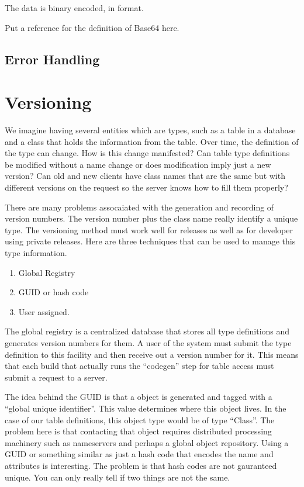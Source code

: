 The data is binary encoded, in  format.
\begin{fixme}
Put a reference for the definition of Base64 here.
\end{fixme}

\subsection{Error Handling}


\section{Versioning}

We imagine having several entities which are types, such as a table in
a database and a class that holds the information from the table. Over
time, the definition of the type can change. How is this change
manifested? Can table type definitions be modified without a name
change or does modification imply just a new version? Can old and new
clients have class names that are the same but with different versions
on the request so the server knows how to fill them properly? 

There are many problems assocaiated with the generation and recording
of version numbers.  The version number plus the class name really 
identify a unique type.  The versioning method must work well
for releases as well as for developer using private releases. 
Here are three techniques that can be used to
manage this type information.

\begin{enumerate}

\item Global Registry
\item GUID or hash code
\item User assigned.

\end{enumerate}


The global registry is a centralized database that stores all type 
definitions and generates version numbers for them.  A user of the
system must submit the type definition to this facility and then
receive out a version number for it.  This means that each build
that actually runs the ``codegen'' step for table access must submit
a request to a server.

The idea behind the GUID is that a object is generated and tagged
with a ``global unique identifier''.  This value determines where
this object lives.  In the case of our table definitions, this
object type would be of type ``Class''.  The problem here is that
contacting that object requires distributed processing machinery
such as nameservers and perhaps a global object repository.  Using
a GUID or something similar as just a hash code that encodes the 
name and attributes is interesting. The problem is that hash codes
are not gauranteed unique.  You can only really tell if two things
are not the same.

